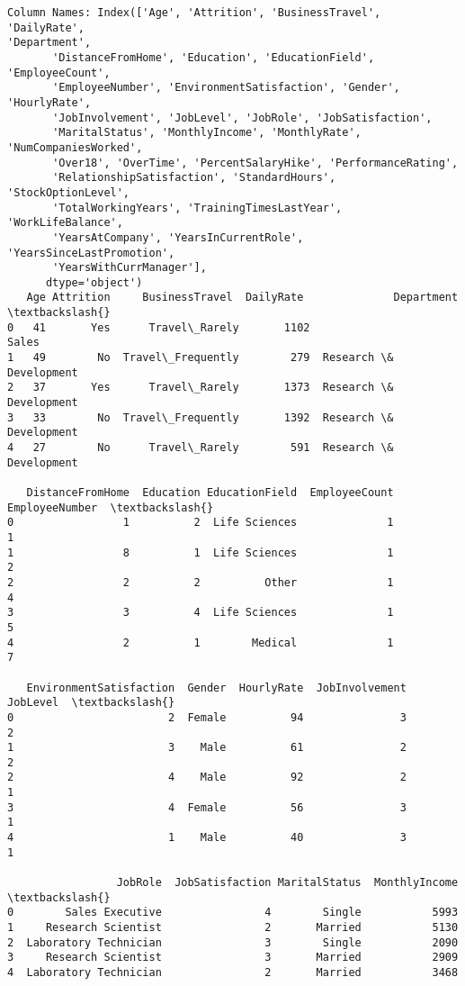 \documentclass[11pt]{article}
\begin{document}
    \begin{Verbatim}[commandchars=\\\{\}]
Column Names: Index(['Age', 'Attrition', 'BusinessTravel', 'DailyRate',
'Department',
       'DistanceFromHome', 'Education', 'EducationField', 'EmployeeCount',
       'EmployeeNumber', 'EnvironmentSatisfaction', 'Gender', 'HourlyRate',
       'JobInvolvement', 'JobLevel', 'JobRole', 'JobSatisfaction',
       'MaritalStatus', 'MonthlyIncome', 'MonthlyRate', 'NumCompaniesWorked',
       'Over18', 'OverTime', 'PercentSalaryHike', 'PerformanceRating',
       'RelationshipSatisfaction', 'StandardHours', 'StockOptionLevel',
       'TotalWorkingYears', 'TrainingTimesLastYear', 'WorkLifeBalance',
       'YearsAtCompany', 'YearsInCurrentRole', 'YearsSinceLastPromotion',
       'YearsWithCurrManager'],
      dtype='object')
   Age Attrition     BusinessTravel  DailyRate              Department  \textbackslash{}
0   41       Yes      Travel\_Rarely       1102                   Sales
1   49        No  Travel\_Frequently        279  Research \& Development
2   37       Yes      Travel\_Rarely       1373  Research \& Development
3   33        No  Travel\_Frequently       1392  Research \& Development
4   27        No      Travel\_Rarely        591  Research \& Development

   DistanceFromHome  Education EducationField  EmployeeCount  EmployeeNumber  \textbackslash{}
0                 1          2  Life Sciences              1               1
1                 8          1  Life Sciences              1               2
2                 2          2          Other              1               4
3                 3          4  Life Sciences              1               5
4                 2          1        Medical              1               7

   EnvironmentSatisfaction  Gender  HourlyRate  JobInvolvement  JobLevel  \textbackslash{}
0                        2  Female          94               3         2
1                        3    Male          61               2         2
2                        4    Male          92               2         1
3                        4  Female          56               3         1
4                        1    Male          40               3         1

                 JobRole  JobSatisfaction MaritalStatus  MonthlyIncome  \textbackslash{}
0        Sales Executive                4        Single           5993
1     Research Scientist                2       Married           5130
2  Laboratory Technician                3        Single           2090
3     Research Scientist                3       Married           2909
4  Laboratory Technician                2       Married           3468


\end{Verbatim}
\end{document}
